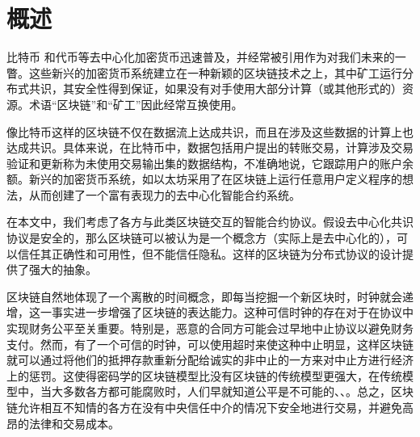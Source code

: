 \documentclass{xduugtrans}
\begin{document}
\frontmatter
\mainmatter
\chapter{概述}
比特币\cite{ref48} 和代币\cite{ref20}等去中心化加密货币迅速普及，并经常被引用作为对我们未来的一瞥\cite{ref5}。这些新兴的加密货币系统建立在一种新颖的区块链技术之上，其中矿工运行分布式共识，其安全性得到保证，如果没有对手使用大部分计算（或其他形式的）资源。术语“区块链”和“矿工”因此经常互换使用。

像比特币这样的区块链不仅在数据流上达成共识，而且在涉及这些数据的计算上也达成共识。具体来说，在比特币中，数据包括用户提出的转账交易，计算涉及交易验证和更新称为未使用交易输出集的数据结构，不准确地说，它跟踪用户的账户余额。新兴的加密货币系统，如以太坊\cite{ref57}采用了在区块链上运行任意用户定义程序的想法，从而创建了一个富有表现力的去中心化智能合约系统。

在本文中，我们考虑了各方与此类区块链交互的智能合约协议。假设去中心化共识协议是安全的，那么区块链可以被认为是一个概念方（实际上是去中心化的），可以信任其正确性和可用性，但不能信任隐私。这样的区块链为分布式协议的设计提供了强大的抽象。

区块链自然地体现了一个离散的时间概念，即每当挖掘一个新区块时，时钟就会递增，这一事实进一步增强了区块链的表达能力。这种可信时钟的存在对于在协议中实现财务公平至关重要。特别是，恶意的合同方可能会过早地中止协议以避免财务支付。然而，有了一个可信的时钟，可以使用超时来使这种中止明显，这样区块链就可以通过将他们的抵押存款重新分配给诚实的非中止的一方来对中止方进行经济上的惩罚。这使得密码学的区块链模型比没有区块链的传统模型更强大，在传统模型中，当大多数各方都可能腐败时，人们早就知道公平是不可能的\cite{ref8}、\cite{ref17}、\cite{ref24}。总之，区块链允许相互不知情的各方在没有中央信任中介的情况下安全地进行交易，并避免高昂的法律和交易成本。
\end{document}

